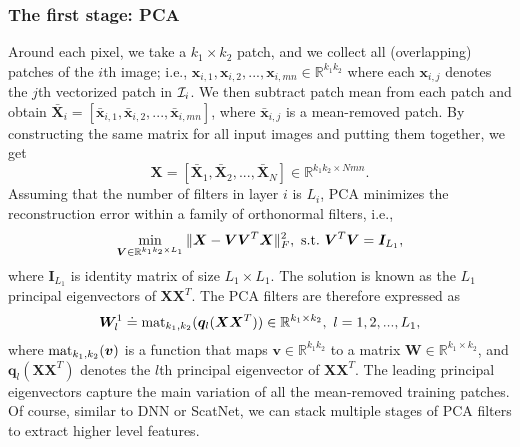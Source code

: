\documentclass[10pt,journal,compsoc]{IEEEtran}
\begin{document}
\subsubsection{\bf The first stage: PCA} \label{sec: The first stage}
Around each pixel, we take a $k_1\times k_2$ patch, and we collect all (overlapping) patches of the $i$th image; i.e., $\bm{ x}_{i,1},\bm{  x}_{i,2},...,\bm{ x}_{i,mn}\in\mathbb{R}^{k_1k_2} $ where each $\bm{ x}_{i,j}$ denotes the $j$th vectorized patch in ${\cal I}_i$. We then subtract patch mean from each patch and obtain $\bar{\bm{ X}}_i = [\bar{\bm{  x}}_{i,1},\bar{\bm{ x}}_{i,2},...,\bar{\bm{ x}}_{i,mn}]$, where $\bar{\bm{ x}}_{i,j}$ is a mean-removed patch. By constructing the same matrix for all input images and putting them together, we get
\begin{equation}\label{eq: datamatrix_1}
\bm{ X} = [\bar{\bm{ X}}_1,\bar{\bm{ X}}_2,...,\bar{\bm{ X}}_N]\in\mathbb{R}^{k_1k_2 \times Nmn}.
\end{equation}Assuming that the number of filters in layer $i$ is $L_i$, PCA minimizes the reconstruction error within a family of orthonormal filters, i.e.,
\begin{equation}
\min_{\bm{ V}\in \mathbb{R}^{k_1k_2 \times L_1}} \|\bm{ X} - \bm{ V}\bm{ V}^T\bm{ X}\|_F^2,~{\rm s.t.}~ \bm{ V}^T\bm{ V} = \bm{  I}_{L_1},
\end{equation}where $\bm{  I}_{L_1}$ is identity matrix of size $L_1\times L_1$. The solution is known as the $L_1$ principal eigenvectors of $\bm{ X}\bm{ X}^T$. The PCA filters are therefore expressed as
\begin{equation}\label{eq: PCAfilter1}
\bm{ W}^1_l \doteq {\rm mat}_{k_1,k_2}(\bm{ q}_l(\bm{ X}\bm{ X}^T))\in\mathbb{R}^{k_1 \times k_2},~l = 1,2,...,L_1,
\end{equation}where ${\rm mat}_{k_1,k_2}(\bm{ v})$ is a function that maps $\bm{ v}\in \mathbb{R}^{k_1k_2}$ to a matrix $\bm{ W}\in \mathbb{R}^{k_1 \times k_2}$, and $\bm{ q}_l(\bm{ X}\bm{ X}^T)$ denotes the $l$th principal eigenvector of $\bm{ X}\bm{ X}^T$. The leading principal eigenvectors capture the main variation of all the mean-removed training patches. Of course, similar to DNN or ScatNet, we can stack multiple stages of PCA filters to extract higher level features.
\end{document}
